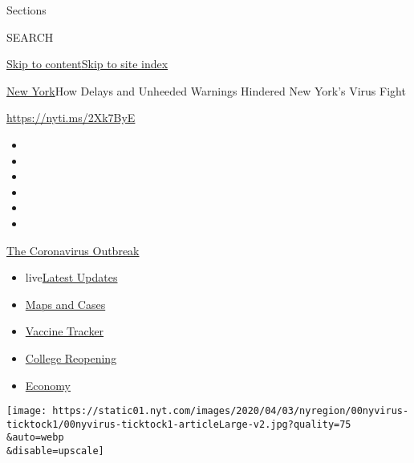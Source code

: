 Sections

SEARCH

\protect\hyperlink{site-content}{Skip to
content}\protect\hyperlink{site-index}{Skip to site index}

\href{/section/nyregion}{New York}\textbar{}How Delays and Unheeded
Warnings Hindered New York's Virus Fight

\url{https://nyti.ms/2Xk7ByE}

\begin{itemize}
\item
\item
\item
\item
\item
\item
\end{itemize}

\href{https://www.nytimes.com/news-event/coronavirus?action=click\&pgtype=Article\&state=default\&region=TOP_BANNER\&context=storylines_menu}{The
Coronavirus Outbreak}

\begin{itemize}
\tightlist
\item
  live\href{https://www.nytimes.com/2020/08/04/world/coronavirus-cases.html?action=click\&pgtype=Article\&state=default\&region=TOP_BANNER\&context=storylines_menu}{Latest
  Updates}
\item
  \href{https://www.nytimes.com/interactive/2020/us/coronavirus-us-cases.html?action=click\&pgtype=Article\&state=default\&region=TOP_BANNER\&context=storylines_menu}{Maps
  and Cases}
\item
  \href{https://www.nytimes.com/interactive/2020/science/coronavirus-vaccine-tracker.html?action=click\&pgtype=Article\&state=default\&region=TOP_BANNER\&context=storylines_menu}{Vaccine
  Tracker}
\item
  \href{https://www.nytimes.com/2020/08/02/us/covid-college-reopening.html?action=click\&pgtype=Article\&state=default\&region=TOP_BANNER\&context=storylines_menu}{College
  Reopening}
\item
  \href{https://www.nytimes.com/live/2020/08/04/business/stock-market-today-coronavirus?action=click\&pgtype=Article\&state=default\&region=TOP_BANNER\&context=storylines_menu}{Economy}
\end{itemize}

\texttt{[image: https://static01.nyt.com/images/2020/04/03/nyregion/00nyvirus-ticktock1/00nyvirus-ticktock1-articleLarge-v2.jpg?quality=75\\\&auto=webp\\\&disable=upscale]}

